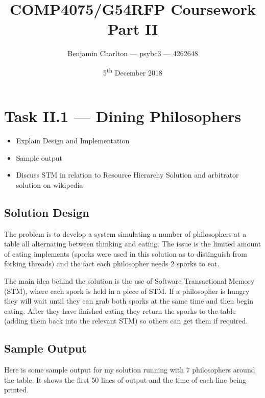 \documentclass[a4paper]{article}
\title{COMP4075/G54RFP Coursework Part II}
\date{5\textsuperscript{th} December 2018}
\author{Benjamin Charlton --- psybc3 --- 4262648}
\begin{document}
\maketitle

\section{Task II.1 --- Dining Philosophers}
\begin{itemize}
    \item Explain Design and Implementation
    \item Sample output
    \item Discuss STM in relation to Resource Hierarchy Solution and arbitrator solution on wikipedia
\end{itemize}

\subsection{Solution Design}
The problem is to develop a system simulating a number of philosophers at a table all alternating between thinking and eating.
The issue is the limited amount of eating implements (sporks were used in this solution as to distinguish from forking threads) and the fact each philosopher needs 2 sporks to eat.
\par
The main idea behind the solution is the use of Software Transactional Memory (STM), where each spork is held in a piece of STM\@.
If a philosopher is hungry they will wait until they can grab both sporks at the same time and then begin eating.
After they have finished eating they return the sporks to the table (adding them back into the relevant STM) so others can get them if required.

\subsection{Sample Output}
Here is some sample output for my solution running with 7 philosophers around the table.
It shows the first 50 lines of output and the time of each line being printed.
\begin{center}
    \begin{multicols}{2}
        
    \end{multicols}
\end{center}



% 
\end{document}
